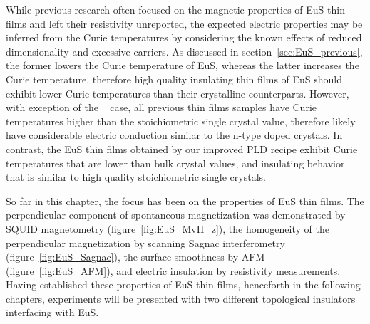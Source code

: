 %
While previous research often focused on the magnetic properties of EuS thin films and left their resistivity unreported, the expected electric properties may be inferred from the Curie temperatures by considering the known effects of reduced dimensionality and excessive carriers. As discussed in section~\ref{sec:EuS_previous}, the former lowers the Curie temperature of EuS, whereas the latter increases the Curie temperature, therefore high quality insulating thin films of EuS should exhibit lower Curie temperatures than their crystalline counterparts. However, with exception of the \citeauthor{EuS_MBE_Dauth}~\citeyear{EuS_MBE_Dauth} case, all previous thin films samples have Curie temperatures higher than the stoichiometric single crystal value, therefore likely have considerable electric conduction similar to the n-type doped crystals. In contrast, the EuS thin films obtained by our improved PLD recipe exhibit Curie temperatures that are lower than bulk crystal values, and insulating behavior that is similar to high quality stoichiometric single crystals.

So far in this chapter, the focus has been on the properties of EuS thin films. The perpendicular component of spontaneous magnetization was demonstrated by SQUID magnetometry (figure~\ref{fig:EuS_MvH_z}), the homogeneity of the perpendicular magnetization by scanning Sagnac interferometry (figure~\ref{fig:EuS_Sagnac}), the surface smoothness by AFM (figure~\ref{fig:EuS_AFM}), and electric insulation by resistivity measurements. Having established these properties of EuS thin films, henceforth in the following chapters, experiments will be presented with two different topological insulators interfacing with EuS.
